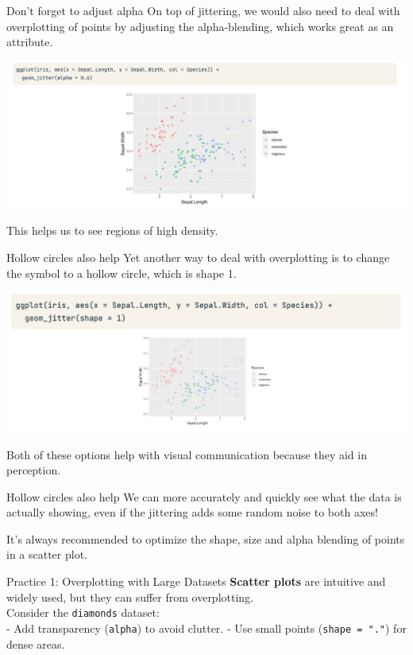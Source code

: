 \documentclass[
  ignorenonframetext,
]{beamer}
\begin{document}
\begin{frame}{Don't forget to adjust alpha}
\label{dont-forget-to-adjust-alpha}
On top of jittering, we would also need to deal with overplotting of
points by adjusting the alpha-blending, which works great as an
attribute.

\includegraphics{../images/im196.png}

This helps us to see regions of high density.
\end{frame}

\begin{frame}{Hollow circles also help}
\label{hollow-circles-also-help}
Yet another way to deal with overplotting is to change the symbol to a
hollow circle, which is shape 1.

\includegraphics{../images/im197.png}

Both of these options help with visual communication because they aid in
perception.
\end{frame}

\begin{frame}{Hollow circles also help}
\label{hollow-circles-also-help-1}
We can more accurately and quickly see what the data is actually
showing, even if the jittering adds some random noise to both axes!

It's always recommended to optimize the shape, size and alpha blending
of points in a scatter plot.
\end{frame}

\begin{frame}[fragile]{Practice 1: Overplotting with Large Datasets}
\label{practice-1-overplotting-with-large-datasets}
\textbf{Scatter plots} are intuitive and widely used, but they can
suffer from overplotting.\\
Consider the \texttt{diamonds} dataset:\\
- Add transparency (\texttt{alpha}) to avoid clutter. - Use small points
(\texttt{shape\ =\ "."}) for dense areas.
\end{frame}
\end{document}

